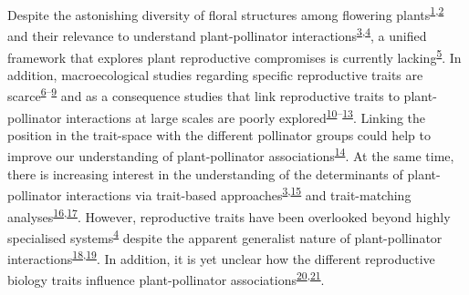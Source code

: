 \documentclass[12pt,a4paper,]{article}
\begin{document}
\doublespacing
\vspace{5mm} \normalsize

Despite the astonishing diversity of floral structures among flowering
plants\textsuperscript{\protect\hyperlink{ref-barrett2002}{1},\protect\hyperlink{ref-schiestl2013}{2}}
and their relevance to understand plant-pollinator
interactions\textsuperscript{\protect\hyperlink{ref-fenster2004}{3},\protect\hyperlink{ref-dellinger2020}{4}},
a unified framework that explores plant reproductive compromises is
currently lacking\textsuperscript{\protect\hyperlink{ref-roddy2021}{5}}.
In addition, macroecological studies regarding specific reproductive
traits are
scarce\textsuperscript{\protect\hyperlink{ref-baude2016}{6}--\protect\hyperlink{ref-moeller2017}{9}}
and as a consequence studies that link reproductive traits to
plant-pollinator interactions at large scales are poorly
explored\textsuperscript{\protect\hyperlink{ref-sargent2008}{10}--\protect\hyperlink{ref-ruger2018}{13}}.
Linking the position in the trait-space with the different pollinator
groups could help to improve our understanding of plant-pollinator
associations\textsuperscript{\protect\hyperlink{ref-dehling2016}{14}}.
At the same time, there is increasing interest in the understanding of
the determinants of plant-pollinator interactions via trait-based
approaches\textsuperscript{\protect\hyperlink{ref-fenster2004}{3},\protect\hyperlink{ref-rosas2014}{15}}
and trait-matching
analyses\textsuperscript{\protect\hyperlink{ref-stang2009}{16},\protect\hyperlink{ref-bartomeus2016}{17}}.
However, reproductive traits have been overlooked beyond highly
specialised
systems\textsuperscript{\protect\hyperlink{ref-dellinger2020}{4}}
despite the apparent generalist nature of plant-pollinator
interactions\textsuperscript{\protect\hyperlink{ref-waser1996}{18},\protect\hyperlink{ref-olesen2002}{19}}.
In addition, it is yet unclear how the different reproductive biology
traits influence plant-pollinator
associations\textsuperscript{\protect\hyperlink{ref-tur2013}{20},\protect\hyperlink{ref-devaux2014}{21}}.
\end{document}
